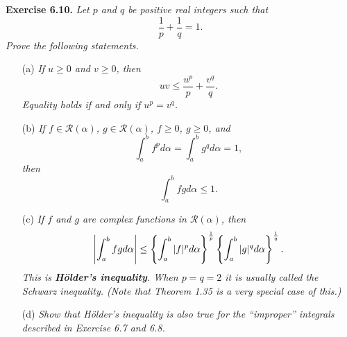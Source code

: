\documentclass{article}
\begin{document}
\textbf{Exercise 6.10.}
\emph{Let $p$ and $q$ be positive real integers such that
\[
  \frac{1}{p} + \frac{1}{q} = 1.
\]
Prove the following statements.}
\begin{enumerate}
  \item[(a)]
  \emph{If $u \geq 0$ and $v \geq 0$, then
  \[
    uv \leq \frac{u^p}{p} + \frac{v^q}{q}.
  \]
  Equality holds if and only if $u^p = v^q$.}

  \item[(b)]
  \emph{If $f \in \mathscr{R}(\alpha)$, $g \in \mathscr{R}(\alpha)$,
  $f \geq 0$, $g \geq 0$, and
  \[
    \int_{a}^{b} f^p d\alpha = \int_{a}^{b} g^q d\alpha = 1,
  \]
  then
  \[
    \int_{a}^{b} fg d\alpha \leq 1.
  \]}

  \item[(c)]
  \emph{If $f$ and $g$ are complex functions in $\mathscr{R}(\alpha)$, then
  \[
    \abs{ \int_{a}^{b} fg d\alpha }
    \leq
    \left\{ \int_{a}^{b} |f|^p d\alpha \right\}^{\frac{1}{p}}
    \left\{ \int_{a}^{b} |g|^q d\alpha \right\}^{\frac{1}{q}}.
  \]
  This is \textbf{H\"older's inequality}.
  When $p=q=2$ it is usually called the Schwarz inequality.
  (Note that Theorem 1.35 is a very special case of this.)}

  \item[(d)]
  \emph{Show that H\"older's inequality is also true for the ``improper'' integrals
  described in Exercise 6.7 and 6.8.} \\
\end{enumerate}
\end{document}
